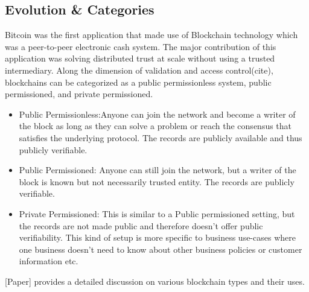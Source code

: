 \subsection{Evolution \& Categories}
Bitcoin was the first application that made use of Blockchain technology which
was a peer-to-peer electronic cash system. The major contribution of this
application was solving distributed trust at scale without using a trusted
intermediary. 
Along the dimension of validation and access control(cite), blockchains can be
categorized as a public permissionless system, public permissioned, and private
permissioned. 
\begin{itemize}
	\item Public Permissionless:Anyone can join the network and become a writer
		of the block as long as they can solve a problem or reach the consensus
		that satisfies the underlying protocol. The records are publicly
		available and thus publicly verifiable. 
	\item Public Permissioned: Anyone can still join the network, but a writer
		of the block is known but not necessarily trusted entity. The records
		are publicly verifiable. 
	\item Private Permissioned: This is similar to a Public permissioned
		setting, but the records are not made public and therefore doesn't
		offer public verifiability. This kind of setup is more specific to
		business use-cases where one business doesn't need to know about other
		business policies or customer information etc. 
\end{itemize}
[Paper] provides a detailed discussion on various blockchain types and their
uses.


